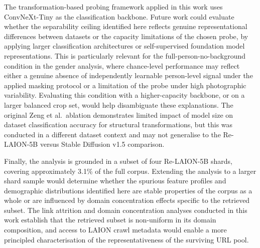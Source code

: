 The transformation-based probing framework applied in this work uses ConvNeXt-Tiny as
the classification backbone. Future work could evaluate whether the separability ceiling
identified here reflects genuine representational differences between datasets or the
capacity limitations of the chosen probe, by applying larger classification architectures
or self-supervised foundation model representations. This is particularly relevant for
the full-person-no-background condition in the gender analysis, where chance-level
performance may reflect either a genuine absence of independently learnable person-level
signal under the applied masking protocol or a limitation of the probe under high
photographic variability. Evaluating this condition with a higher-capacity backbone, or
on a larger balanced crop set, would help disambiguate these explanations. The original
Zeng et al.\ ablation demonstrates limited impact of model size on dataset classification
accuracy for structural transformations, but this was conducted in a different dataset
context and may not generalise to the Re-LAION-5B versus Stable Diffusion v1.5
comparison.

Finally, the analysis is grounded in a subset of four Re-LAION-5B shards, covering
approximately 3.1\% of the full corpus. Extending the analysis to a larger shard sample
would determine whether the spurious feature profiles and demographic distributions
identified here are stable properties of the corpus as a whole or are influenced by
domain concentration effects specific to the retrieved subset. The link attrition and
domain concentration analyses conducted in this work establish that the retrieved subset
is non-uniform in its domain composition, and access to LAION crawl metadata would enable
a more principled characterisation of the representativeness of the surviving URL pool.